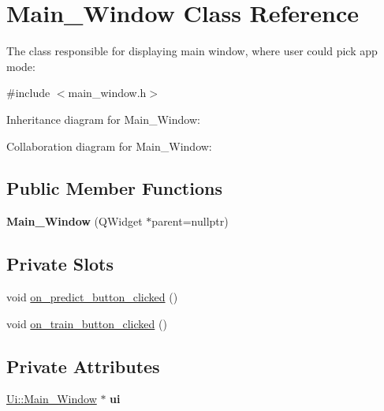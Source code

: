 \hypertarget{class_main___window}{}\section{Main\+\_\+\+Window Class Reference}
\label{class_main___window}


The class responsible for displaying main window, where user could pick app mode\+:  




{\ttfamily \#include $<$main\+\_\+window.\+h$>$}



Inheritance diagram for Main\+\_\+\+Window\+:


Collaboration diagram for Main\+\_\+\+Window\+:
\subsection*{Public Member Functions}
\begin{DoxyCompactItemize}
\item 
\mbox{\label{class_main___window_a74de7d059afe56907e349276d60910d1}} 
{\bfseries Main\+\_\+\+Window} (Q\+Widget $\ast$parent=nullptr)
\end{DoxyCompactItemize}
\subsection*{Private Slots}
\begin{DoxyCompactItemize}
\item 
void \hyperlink{class_main___window_a152cfc3e430cff4fb23f07ef43afaeb5}{on\+\_\+predict\+\_\+button\+\_\+clicked} ()
\item 
void \hyperlink{class_main___window_a4081b8f068e82535e5a0f00924221c21}{on\+\_\+train\+\_\+button\+\_\+clicked} ()
\end{DoxyCompactItemize}
\subsection*{Private Attributes}
\begin{DoxyCompactItemize}
\item 
\mbox{\label{class_main___window_a7d6d58b9addc257e7b469f8f465992fe}} 
\hyperlink{class_ui_1_1_main___window}{Ui\+::\+Main\+\_\+\+Window} $\ast$ {\bfseries ui}
\end{DoxyCompactItemize}


